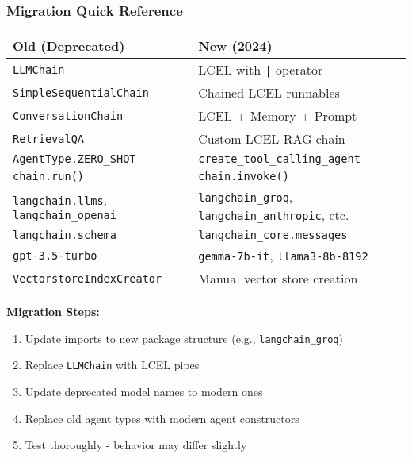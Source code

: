 \begin{frame}[fragile]\frametitle{Migration Quick Reference}

\begin{center}
\begin{tabular}{|p{5cm}|p{5cm}|}
\hline
\textbf{Old (Deprecated)} & \textbf{New (2024)} \\
\hline
\texttt{LLMChain} & LCEL with \texttt{|} operator \\
\hline
\texttt{SimpleSequentialChain} & Chained LCEL runnables \\
\hline
\texttt{ConversationChain} & LCEL + Memory + Prompt \\
\hline
\texttt{RetrievalQA} & Custom LCEL RAG chain \\
\hline
\texttt{AgentType.ZERO\_SHOT} & \texttt{create\_tool\_calling\_agent} \\
\hline
\texttt{chain.run()} & \texttt{chain.invoke()} \\
\hline
\texttt{langchain.llms}, \texttt{langchain\_openai} & \texttt{langchain\_groq}, \texttt{langchain\_anthropic}, etc. \\
\hline
\texttt{langchain.schema} & \texttt{langchain\_core.messages} \\
\hline
\texttt{gpt-3.5-turbo} & \texttt{gemma-7b-it}, \texttt{llama3-8b-8192} \\
\hline
\texttt{VectorstoreIndexCreator} & Manual vector store creation \\
\hline
\end{tabular}
\end{center}

\textbf{Migration Steps:}
\begin{enumerate}
\item Update imports to new package structure (e.g., \texttt{langchain\_groq})
\item Replace \texttt{LLMChain} with LCEL pipes
\item Update deprecated model names to modern ones
\item Replace old agent types with modern agent constructors
\item Test thoroughly - behavior may differ slightly
\end{enumerate}

\end{frame}

